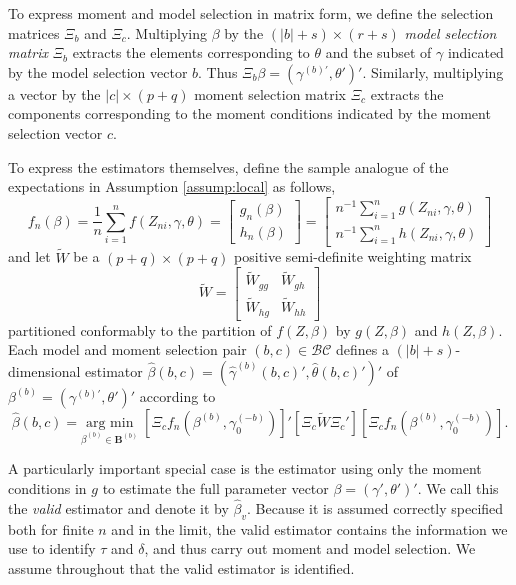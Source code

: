 To express moment and model selection in matrix form, we define the selection matrices $\Xi_b$ and $\Xi_c$.
Multiplying $\beta$ by the $(|b| + s)\times(r+s)$ \emph{model selection matrix} $\Xi_b$ extracts the elements corresponding to $\theta$ and the subset of $\gamma$ indicated by the model selection vector $b$. 
Thus $\Xi_b \beta = \left(\gamma^{(b)'}, \theta' \right)'$.
Similarly, multiplying a vector by the $|c|\times(p+q)$ moment selection matrix $\Xi_c$ extracts the components corresponding to the moment conditions indicated by the moment selection vector $c$. 

To express the estimators themselves, define the sample analogue of the expectations in Assumption \ref{assump:local} as follows,
\begin{equation}
	f_n(\beta) = \frac{1}{n}\sum_{i=1}^n f(Z_{ni}, \gamma, \theta) = \left[\begin{array}{c}g_n(\beta)\\ h_n(\beta) \end{array} \right] = \left[\begin{array}{c} n^{-1}\sum_{i=1}^n g(Z_{ni}, \gamma, \theta)\\n^{-1}\sum_{i=1}^n h(Z_{ni}, \gamma, \theta) \end{array}\right]
\end{equation}
and let $\widetilde{W}$ be a $(p+q)\times(p+q)$ positive semi-definite weighting matrix
\begin{equation}
	\widetilde{W} = \left[\begin{array}{cc} \widetilde{W}_{gg} & \widetilde{W}_{gh}\\ \widetilde{W}_{hg} & \widetilde{W}_{hh}  \end{array}\right]
\end{equation}
partitioned conformably to the partition of $f(Z,\beta)$ by $g(Z,\beta)$ and $h(Z,\beta)$. Each model and moment selection pair $(b,c)\in \mathcal{BC}$ defines a $(|b|+s)$-dimensional estimator $\widehat{\beta}(b,c)=( \widehat{\gamma}^{(b)}(b,c)',\widehat{\theta}(b,c)')'$ of $\beta^{(b)}= \left(\gamma^{(b)'}, \theta'  \right)'$ according to
	\begin{equation}
    \widehat{\beta}(b,c) = \underset{\beta^{(b)}\in \mathbf{B}^{(b)}} {\mbox{arg min}}\;\left[\Xi_c f_n\left(\beta^{(b)}, \gamma_0^{(-b)}\right)\right]'\left[\Xi_c \widetilde{W}\Xi_c' \right]\left[\Xi_c f_n\left(\beta^{(b)}, \gamma_0^{(-b)}\right)\right].
	\end{equation}

  A particularly important special case is the estimator using only the moment conditions in $g$ to estimate the full parameter vector $\beta = \left(\gamma', \theta' \right)'$.
  We call this the \emph{valid} estimator and denote it by $\widehat{\beta}_v$.  
  Because it is assumed correctly specified both for finite $n$ and in the limit, the valid estimator contains the information we use to identify $\tau$ and $\delta$, and thus carry out moment and model selection. 
We assume throughout that the valid estimator is identified.

